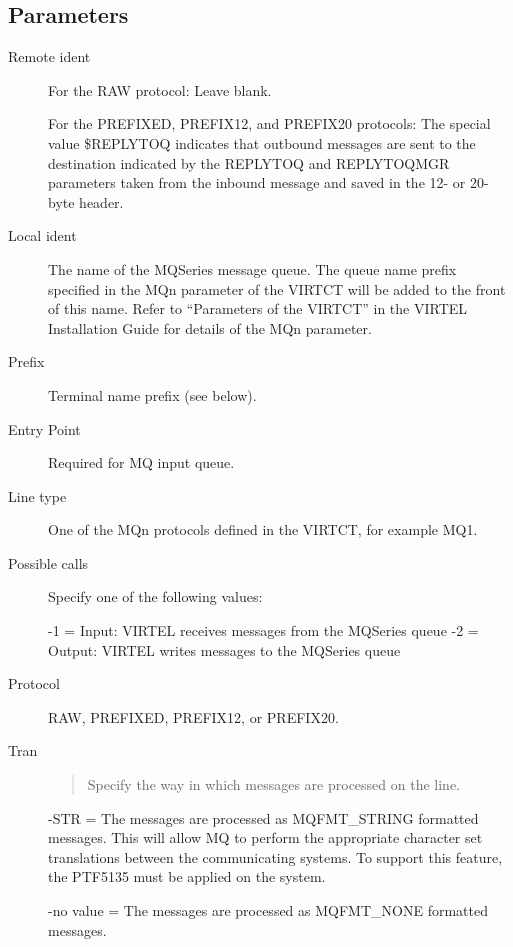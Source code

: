 \documentclass[letterpaper,10pt,english]{sphinxmanual}
\begin{document}


\subsection{Parameters}
\label{\detokenize{connectivity_guide:index-29}}\label{\detokenize{connectivity_guide:id8}}\begin{description}
\item[{Remote ident}] \leavevmode
For the RAW protocol: Leave blank.

For the PREFIXED, PREFIX12, and PREFIX20 protocols: The special
value \$REPLYTOQ indicates that outbound messages are sent to the
destination indicated by the REPLYTOQ and REPLYTOQMGR parameters
taken from the inbound message and saved in the 12- or 20-byte
header.

\item[{Local ident}] \leavevmode
The name of the MQSeries message queue. The queue name prefix
specified in the MQn parameter of the VIRTCT will be added to the
front of this name. Refer to “Parameters of the VIRTCT” in the
VIRTEL Installation Guide for details of the MQn parameter.

\item[{Prefix}] \leavevmode
Terminal name prefix (see below).

\item[{Entry Point}] \leavevmode
Required for MQ input queue.

\item[{Line type}] \leavevmode
One of the MQn protocols defined in the VIRTCT, for example MQ1.

\item[{Possible calls}] \leavevmode
Specify one of the following values:

-1 = Input: VIRTEL receives messages from the MQSeries queue
-2 = Output: VIRTEL writes messages to the MQSeries queue

\item[{Protocol}] \leavevmode
RAW, PREFIXED, PREFIX12, or PREFIX20.

\item[{Tran}] \leavevmode\begin{quote}

Specify the way in which messages are processed on the line.
\end{quote}

-STR = The messages are processed as MQFMT\_STRING formatted messages. This will allow MQ to perform the appropriate character set translations between the communicating systems. To support this feature, the PTF5135 must be applied on the system.

-no value = The messages are processed as MQFMT\_NONE formatted messages.

\end{description}
\end{document}
